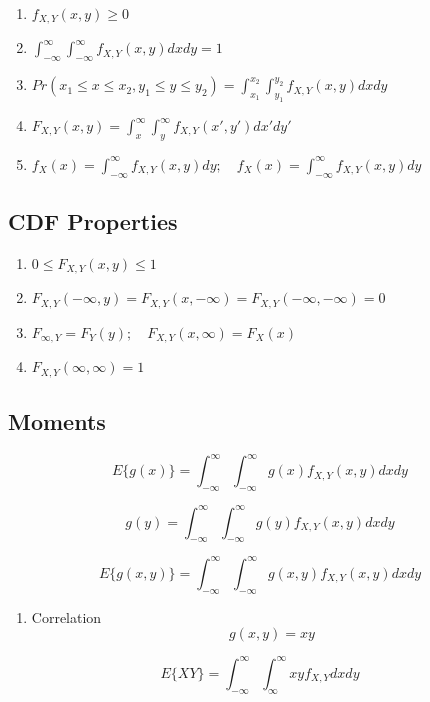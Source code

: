 \documentclass{article}
\begin{document}
\begin{enumerate}
\def\labelenumi{\arabic{enumi}.}
\item
  \(f_{X, Y}(x, y) \geq 0\)
\item
  \(\int_{-\infty}^{\infty} \int_{-\infty}^{\infty} f_{X, Y}(x, y) dx dy = 1\)
\item
  \(Pr(x_1 \leq x \leq x_2, y_1 \leq y \leq y_2) = \int_{x_1}^{x_2} \int_{y_1}^{y_2} f_{X, Y}(x, y) dx dy\)
\item
  \(F_{X, Y}(x, y) = \int_{x}^{\infty} \int_{y}^{\infty} f_{X, Y}(x\prime, y\prime) dx\prime dy\prime\)
\item
  \(f_X(x) = \int_{-\infty}^{\infty}f_{X, Y}(x, y)dy; \quad f_X(x) = \int_{-\infty}^{\infty}f_{X, Y}(x, y)dy\)
\end{enumerate}

\subsection{CDF Properties}

\begin{enumerate}
\def\labelenumi{\arabic{enumi}.}
\item
  \(0 \leq F_{X, Y}(x,y) \leq 1\)
\item
  \(F_{X, Y}(-\infty, y) = F_{X, Y}(x, -\infty) = F_{X, Y}(-\infty, -\infty) = 0\)
\item
  \(F_{\infty, Y} = F_Y(y); \quad F_{X, Y}(x, \infty) = F_X(x)\)
\item
  \(F_{X, Y}(\infty, \infty) = 1\)
\end{enumerate}

\subsection{Moments}

\[
E\{g(x)\} = \int_{-\infty}^{\infty} \int_{-\infty}^{\infty} g(x) f_{X, Y}(x, y) dxdy
\]

\[
g(y) = \int_{-\infty}^{\infty} \int_{-\infty}^{\infty} g(y) f_{X, Y}(x, y) dxdy
\]

\[
E\{g(x, y)\} = \int_{-\infty}^{\infty} \int_{-\infty}^{\infty} g(x ,y) f_{X, Y}(x, y) dxdy
\]

\begin{enumerate}
\def\labelenumi{\arabic{enumi}.}
\item
  Correlation \[
  g(x, y) = xy
  \]
\end{enumerate}

\[
E\{XY\} = \int_{-\infty}^{\infty} \int_{\infty}^{\infty} xy f_{X, Y} dx dy
\]
\end{document}
